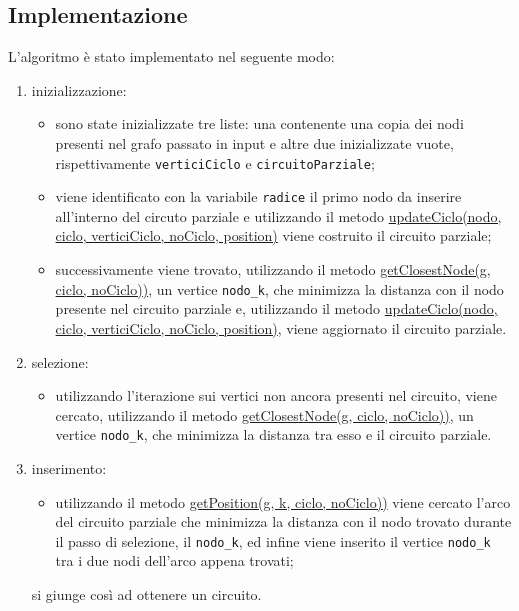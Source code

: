 \subsection{Implementazione}
\label{implementazione2}

L'algoritmo è stato implementato nel seguente modo:

\begin{enumerate}

    \item inizializzazione: 

    \begin{itemize}
        \item sono state inizializzate tre liste: una contenente una copia dei nodi presenti nel grafo passato in input e altre due inizializzate vuote, rispettivamente \texttt{verticiCiclo} e \texttt{circuitoParziale};
        \item viene identificato con la variabile \texttt{radice} il primo nodo da inserire all'interno del circuto parziale e utilizzando il metodo \hyperlink{updateCiclo}{updateCiclo(nodo, ciclo, verticiCiclo, noCiclo, position)} viene costruito il circuito parziale;
        \item successivamente viene trovato, utilizzando il metodo \hyperlink{getClosestNode}{getClosestNode(g, ciclo, noCiclo))}, un vertice \texttt{nodo\_k}, che minimizza la distanza con il nodo presente nel circuito parziale e, utilizzando il metodo \hyperlink{updateCiclo}{updateCiclo(nodo, ciclo, verticiCiclo, noCiclo, position)}, viene aggiornato il circuito parziale.
    \end{itemize}

    \item selezione:

    \begin{itemize}
        \item utilizzando l'iterazione sui vertici non ancora presenti nel circuito, viene cercato, utilizzando il metodo \hyperlink{getClosestNode}{getClosestNode(g, ciclo, noCiclo))}, un vertice \texttt{nodo\_k}, che minimizza la distanza tra esso e il circuito parziale.
    \end{itemize}

    \item inserimento:

    \begin{itemize}
        \item utilizzando il metodo \hyperlink{getPosition}{getPosition(g, k, ciclo, noCiclo))} viene cercato l'arco del circuito parziale che minimizza la distanza con il nodo trovato durante il passo di selezione, il \texttt{nodo\_k}, ed infine viene inserito il vertice \texttt{nodo\_k} tra i due nodi dell'arco appena trovati;
    \end{itemize}

    si giunge così ad ottenere un circuito.
    
\end{enumerate}